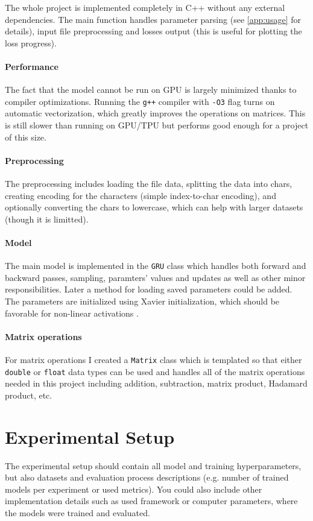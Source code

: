 \documentclass[11pt]{article}
\begin{document}
		The whole project is implemented completely in C++ without any external dependencies. The main function handles parameter parsing (see \ref{app:usage} for details), input file preprocessing and losses output (this is useful for plotting the loss progress).
		
		\paragraph{Performance} The fact that the model cannot be run on GPU is largely minimized thanks to compiler optimizations. Running the \texttt{g++} compiler with \texttt{-O3} flag turns on automatic vectorization, which greatly improves the operations on matrices. This is still slower than running on GPU/TPU but performs good enough for a project of this size.
		
		\paragraph{Preprocessing} The preprocessing includes loading the file data, splitting the data into chars, creating encoding for the characters (simple index-to-char encoding), and optionally converting the chars to lowercase, which can help with larger datasets (though it is limitted).
		
		\paragraph{Model} The main model is implemented in the \texttt{GRU} class which handles both forward and backward passes, sampling, paramters' values and updates as well as other minor responsibilities. Later a method for loading saved parameters could be added. The parameters are initialized using Xavier initialization, which should be favorable for non-linear activations \cite{kumar2017weight}.
		
		\paragraph{Matrix operations} For matrix operations I created a \texttt{Matrix} class which is templated so that either \texttt{double} or \texttt{float} data types can be used and handles all of the matrix operations needed in this project including addition, subtraction, matrix product, Hadamard product, etc.
		
	
	\section{Experimental Setup} \label{sec:setup}
		The experimental setup should contain all model and training hyperparameters, but also datasets and evaluation process descriptions (e.g. number of trained models per experiment or used metrics). 
		You could also include other implementation details such as used framework or computer parameters, where the models were trained and evaluated.
		
\end{document}
